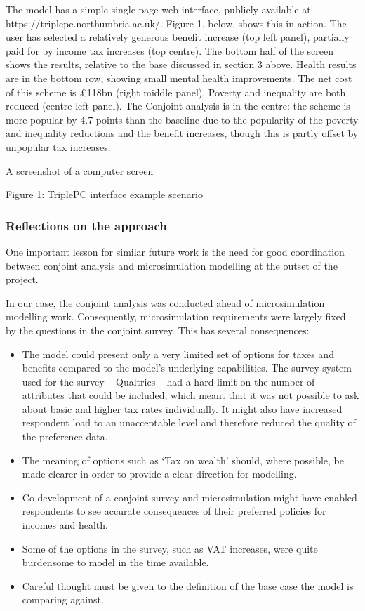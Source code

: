 \documentclass[
  letterpaper,
  DIV=11,
  numbers=noendperiod]{scrartcl}
\providecommand{\tightlist}{%
  \setlength{\itemsep}{0pt}\setlength{\parskip}{0pt}}\usepackage{longtable,booktabs,array}
\begin{document}
The model has a simple single page web interface, publicly available at
https://triplepc.northumbria.ac.uk/. Figure 1, below, shows this in
action. The user has selected a relatively generous benefit increase
(top left panel), partially paid for by income tax increases (top
centre). The bottom half of the screen shows the results, relative to
the base discussed in section 3 above. Health results are in the bottom
row, showing small mental health improvements. The net cost of this
scheme is £118bn (right middle panel). Poverty and inequality are both
reduced (centre left panel). The Conjoint analysis is in the centre: the
scheme is more popular by 4.7 points than the baseline due to the
popularity of the poverty and inequality reductions and the benefit
increases, though this is partly offset by unpopular tax increases.

A screenshot of a computer screen

Figure 1: TriplePC interface example scenario

\subsubsection{Reflections on the
approach}\label{reflections-on-the-approach}

One important lesson for similar future work is the need for good
coordination between conjoint analysis and microsimulation modelling at
the outset of the project.

In our case, the conjoint analysis was conducted ahead of
microsimulation modelling work. Consequently, microsimulation
requirements were largely fixed by the questions in the conjoint survey.
This has several consequences:

\begin{itemize}
\tightlist
\item
  The model could present only a very limited set of options for taxes
  and benefits compared to the model's underlying capabilities. The
  survey system used for the survey -- Qualtrics -- had a hard limit on
  the number of attributes that could be included, which meant that it
  was not possible to ask about basic and higher tax rates individually.
  It might also have increased respondent load to an unacceptable level
  and therefore reduced the quality of the preference data.
\item
  The meaning of options such as `Tax on wealth' should, where possible,
  be made clearer in order to provide a clear direction for modelling.
\item
  Co-development of a conjoint survey and microsimulation might have
  enabled respondents to see accurate consequences of their preferred
  policies for incomes and health.\\
\item
  Some of the options in the survey, such as VAT increases, were quite
  burdensome to model in the time available.\\
\item
  Careful thought must be given to the definition of the base case the
  model is comparing against.
\end{itemize}
\end{document}
